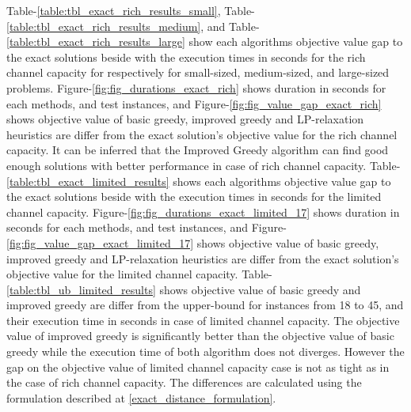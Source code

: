\documentclass[11pt]{article}
\begin{document}
Table-\ref{table:tbl_exact_rich_results_small}, Table-\ref{table:tbl_exact_rich_results_medium}, and Table-\ref{table:tbl_exact_rich_results_large} show each algorithms objective value gap to the exact solutions beside with the execution times in seconds for the rich channel capacity for respectively for small-sized, medium-sized, and large-sized problems. Figure-\ref{fig:fig_durations_exact_rich} shows duration in seconds for each methods, and test instances, and Figure-\ref{fig:fig_value_gap_exact_rich} shows objective value of basic greedy, improved greedy and LP-relaxation heuristics are differ from the exact solution's objective value for the rich channel capacity. It can be inferred that the Improved Greedy algorithm can find good enough solutions with better performance in case of rich channel capacity. 
Table-\ref{table:tbl_exact_limited_results} shows each algorithms objective value gap to the exact solutions beside with the execution times in seconds for the limited channel capacity. Figure-\ref{fig:fig_durations_exact_limited_17} shows duration in seconds for each methods, and test instances, and Figure-\ref{fig:fig_value_gap_exact_limited_17} shows objective value of basic greedy, improved greedy and LP-relaxation heuristics are differ from the exact solution's objective value for the limited channel capacity. Table-\ref{table:tbl_ub_limited_results} shows objective value of basic greedy and improved greedy are differ from the upper-bound for instances from 18 to 45, and their execution time in seconds in case of limited channel capacity. The objective value of improved greedy is significantly better than the objective value of basic greedy while the execution time of both algorithm does not diverges. However the gap on the objective value of limited channel capacity case is not as tight as in the case of rich channel capacity.
The differences are calculated using the formulation described at \equationautorefname \eqref{exact_distance_formulation}.\\
\end{document}
